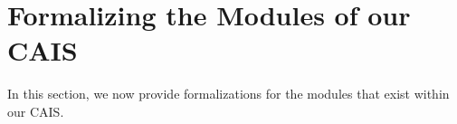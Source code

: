 \section{Formalizing the Modules of our CAIS}

In this section, we now provide formalizations for the modules that exist within our
CAIS. 